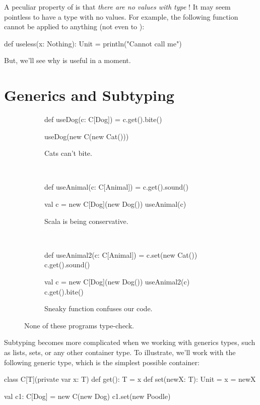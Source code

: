 \documentclass[9pt]{extbook}
\begin{document}
A peculiar property of  is that
\emph{there are no values with type} !
It may seem pointless to have a type with no values. For example, the following
function cannot be applied to anything (not even to ):
\begin{scalacode}
def useless(x: Nothing): Unit = {
  println("Cannot call me")
}
\end{scalacode}

But, we'll see why  is useful in a moment.

\section{Generics and Subtyping}

\begin{figure}
\begin{subfigure}[b]{0.26\textwidth}
\begin{scalacode}
def useDog(c: C[Dog]) = {
  c.get().bite()
}

useDog(new C(new Cat()))
\end{scalacode}
\caption{Cats can't bite.}
\label{catdog1}
\end{subfigure}
~\vrule~
\begin{subfigure}[b]{0.33\textwidth}
\begin{scalacode}
def useAnimal(c: C[Animal]) = {
  c.get().sound()
}

val c = new C[Dog](new Dog())
useAnimal(c)
\end{scalacode}
\label{catdog2}
\caption{Scala is being conservative.}
\end{subfigure}
~\vrule~
\begin{subfigure}[b]{0.31\textwidth}
\begin{scalacode}
def useAnimal2(c: C[Animal]) = {
  c.set(new Cat())
  c.get().sound()
}

val c = new C[Dog](new Dog())
useAnimal2(c)
c.get().bite()
\end{scalacode}
\label{catdog3}
\caption{Sneaky function confuses our code.}
\end{subfigure}
\caption{None of these programs type-check.}
\end{figure}

Subtyping becomes more complicated when we working with generics types, such
as lists, sets, or any other container type. To illustrate, we'll work
with the following generic type, which is the simplest possible container:
%
\begin{scalacode}
class C[T](private var x: T) {
  def get(): T = x
  def set(newX: T): Unit = x = newX
}

val c1: C[Dog] = new C(new Dog)
c1.set(new Poodle)
\end{scalacode}
\end{document}
